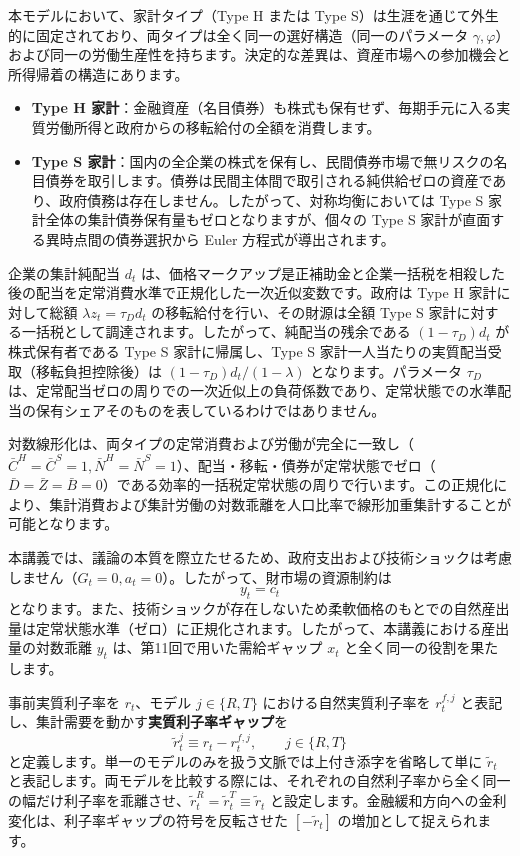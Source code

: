 \documentclass[
  japanese,
  lualatex,
  ja=standard,
  12pt,
  a4paper]{ltjsarticle}
\providecommand{\tightlist}{%
  \setlength{\itemsep}{0pt}\setlength{\parskip}{0pt}}
\begin{document}
本モデルにおいて、家計タイプ（Type H または Type
S）は生涯を通じて外生的に固定されており、両タイプは全く同一の選好構造（同一のパラメータ
\(\gamma, \varphi\)）および同一の労働生産性を持ちます。決定的な差異は、資産市場への参加機会と所得帰着の構造にあります。

\begin{itemize}
\tightlist
\item
  \textbf{Type H
  家計}：金融資産（名目債券）も株式も保有せず、毎期手元に入る実質労働所得と政府からの移転給付の全額を消費します。
\item
  \textbf{Type S
  家計}：国内の全企業の株式を保有し、民間債券市場で無リスクの名目債券を取引します。債券は民間主体間で取引される純供給ゼロの資産であり、政府債務は存在しません。したがって、対称均衡においては
  Type S 家計全体の集計債券保有量もゼロとなりますが、個々の Type S
  家計が直面する異時点間の債券選択から Euler 方程式が導出されます。
\end{itemize}

企業の集計純配当 \(d_t\)
は、価格マークアップ是正補助金と企業一括税を相殺した後の配当を定常消費水準で正規化した一次近似変数です。政府は
Type H 家計に対して総額 \(\lambda z_t = \tau_D d_t\)
の移転給付を行い、その財源は全額 Type S
家計に対する一括税として調達されます。したがって、純配当の残余である
\((1-\tau_D) d_t\) が株式保有者である Type S 家計に帰属し、Type S
家計一人当たりの実質配当受取（移転負担控除後）は
\((1-\tau_D) d_t / (1-\lambda)\) となります。パラメータ \(\tau_D\)
は、定常配当ゼロの周りでの一次近似上の負荷係数であり、定常状態での水準配当の保有シェアそのものを表しているわけではありません。

対数線形化は、両タイプの定常消費および労働が完全に一致し（\(\bar{C}^H = \bar{C}^S = 1, \bar{N}^H = \bar{N}^S = 1\)）、配当・移転・債券が定常状態でゼロ（\(\bar{D} = \bar{Z} = \bar{B} = 0\)）である効率的一括税定常状態の周りで行います。この正規化により、集計消費および集計労働の対数乖離を人口比率で線形加重集計することが可能となります。

本講義では、議論の本質を際立たせるため、政府支出および技術ショックは考慮しません（\(G_t = 0, a_t = 0\)）。したがって、財市場の資源制約は
\[
y_t = c_t
\]
となります。また、技術ショックが存在しないため柔軟価格のもとでの自然産出量は定常状態水準（ゼロ）に正規化されます。したがって、本講義における産出量の対数乖離
\(y_t\) は、第11回で用いた需給ギャップ \(x_t\)
と全く同一の役割を果たします。

事前実質利子率を \(r_t\)、モデル \(j \in \{R, T\}\)
における自然実質利子率を \(r_t^{f,j}\)
と表記し、集計需要を動かす\textbf{実質利子率ギャップ}を \[
\widetilde{r}_t^j \equiv r_t - r_t^{f,j}, \qquad j \in \{R, T\}
\] と定義します。単一のモデルのみを扱う文脈では上付き添字を省略して単に
\(\widetilde{r}_t\)
と表記します。両モデルを比較する際には、それぞれの自然利子率から全く同一の幅だけ利子率を乖離させ、\(\widetilde{r}_t^R = \widetilde{r}_t^T \equiv \widetilde{r}_t\)
と設定します。金融緩和方向への金利変化は、利子率ギャップの符号を反転させた
\([-\widetilde{r}_t]\) の増加として捉えられます。
\end{document}
